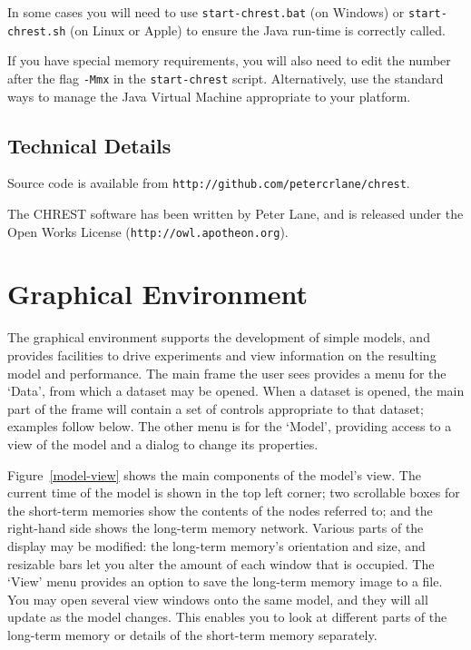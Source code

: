 \documentclass{article}
\begin{document}
In some cases you will need to use {\tt start-chrest.bat} (on Windows) or 
{\tt start-chrest.sh} (on Linux or Apple) to ensure the Java run-time is correctly 
called.

If you have special memory requirements, you will also need to edit the number
after the flag {\tt -Mmx} in the {\tt start-chrest} script.  Alternatively, use
the standard ways to manage the Java Virtual Machine appropriate to your
platform.

\subsection{Technical Details}

Source code is available from {\tt http://github.com/petercrlane/chrest}.

\noindent The CHREST software has been written by Peter Lane, and is released
under the Open Works License ({\tt http://owl.apotheon.org}).


\section{Graphical Environment}

The graphical environment supports the development of simple models, and
provides facilities to drive experiments and view information on the resulting
model and performance.  The main frame the user sees provides a menu for the
`Data', from which a dataset may be opened.  When a dataset is opened, the main
part of the frame will contain a set of controls appropriate to that dataset;
examples follow below.  The other menu is for the `Model', providing access to
a view of the model and a dialog to change its properties.

Figure~\ref{model-view} shows the main components of the model's view.  The
current time of the model is shown in the top left corner; two scrollable boxes
for the short-term memories show the contents of the nodes referred to; and the
right-hand side shows the long-term memory network.  Various parts of the
display may be modified: the long-term memory's orientation and size, and
resizable bars let you alter the amount of each window that is occupied.  The
`View' menu provides an option to save the long-term memory image to a file.
You may open several view windows onto the same model, and they will all update
as the model changes.  This enables you to look at different parts of the
long-term memory or details of the short-term memory separately.
\end{document}
